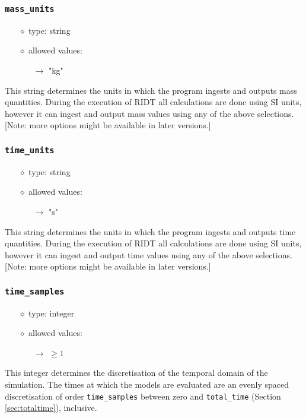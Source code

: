 \documentclass[]{article}
\def\code#1{\texttt{#1}}
\begin{document}
\subsubsection{\code{mass\_units}}\label{sec:massunits}
\begin{itemize}
    \item[$\diamond$] type: string 
    \item[$\diamond$] allowed values:
    \begin{itemize}
        \item[$\rightarrow$] "kg"
    \end{itemize}
\end{itemize}
This string determines the units in which the program ingests and outputs mass
quantities. During the execution of RIDT all calculations are done using SI
units, however it can ingest and output mass values using any of the above
selections. [Note: more options might be available in later versions.]

\subsubsection{\code{time\_units}}\label{sec:timeunits}
\begin{itemize}
    \item[$\diamond$] type: string 
    \item[$\diamond$] allowed values:
    \begin{itemize}
        \item[$\rightarrow$] "s"
    \end{itemize}
\end{itemize}
This string determines the units in which the program ingests and outputs time
quantities. During the execution of RIDT all calculations are done using SI
units, however it can ingest and output time values using any of the above
selections. [Note: more options might be available in later versions.]

\subsubsection{\code{time\_samples}}\label{sec:timesamples}
\begin{itemize}
    \item[$\diamond$] type: integer 
    \item[$\diamond$] allowed values:
    \begin{itemize}
        \item[$\rightarrow$] $\geq1$
    \end{itemize}
\end{itemize}
This integer determines the discretisation of the temporal domain of the
simulation. The times at which the models are evaluated are an evenly spaced
discretisation of order \code{time\_samples} between zero and \code{total\_time}
(Section \ref{sec:totaltime}), inclusive.
\end{document}
